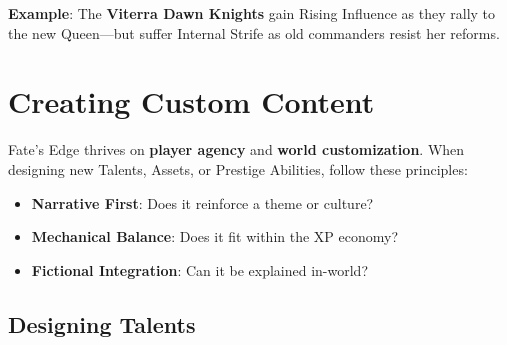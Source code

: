 \textbf{Example}: The \textbf{Viterra Dawn Knights} gain Rising Influence as they rally to the new Queen---but suffer Internal Strife as old commanders resist her reforms.

\section*{Creating Custom Content}

Fate's Edge thrives on \textbf{player agency} and \textbf{world customization}. When designing new Talents, Assets, or Prestige Abilities, follow these principles:

\begin{itemize}
    \item \textbf{Narrative First}: Does it reinforce a theme or culture?
    \item \textbf{Mechanical Balance}: Does it fit within the XP economy?
    \item \textbf{Fictional Integration}: Can it be explained in-world?
\end{itemize}

\subsection*{Designing Talents}

